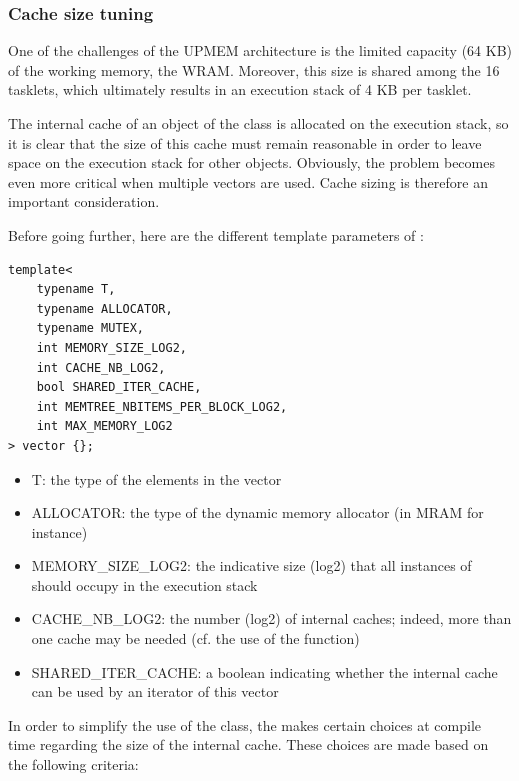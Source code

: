 \subsubsection{Cache size tuning}

One of the challenges of the UPMEM architecture is the limited capacity (64 KB) of the working memory, the WRAM. Moreover, this size is shared among the 16 tasklets, which ultimately results in an execution stack of 4 KB per tasklet. 

The internal cache of an object of the  class is allocated on the execution stack, so it is clear that the size of this cache must remain reasonable in order to leave space on the execution stack for other objects. 
Obviously, the problem becomes even more critical when multiple vectors are used. Cache sizing is therefore an important consideration.

Before going further, here are the different template parameters of :

\begin{verbatim}
template<
    typename T,
    typename ALLOCATOR,
    typename MUTEX,
    int MEMORY_SIZE_LOG2,
    int CACHE_NB_LOG2,
    bool SHARED_ITER_CACHE,
    int MEMTREE_NBITEMS_PER_BLOCK_LOG2,
    int MAX_MEMORY_LOG2
> vector {};
\end{verbatim}

\begin{itemize}
\item T: the type of the elements in the vector
\item ALLOCATOR: the type of the dynamic memory allocator (in MRAM for instance)
\item MEMORY\_SIZE\_LOG2: the indicative size (log2) that all instances of  should occupy in the execution stack
\item CACHE\_NB\_LOG2: the number (log2) of internal caches; indeed, more than one cache may be needed (cf. the use of the  function)
\item SHARED\_ITER\_CACHE: a boolean indicating whether the internal cache can be used by an iterator of this vector
\end{itemize}

In order to simplify the use of the  class, the \BPL makes certain choices at compile time regarding the size of the internal cache. These choices are made based on the following criteria:

